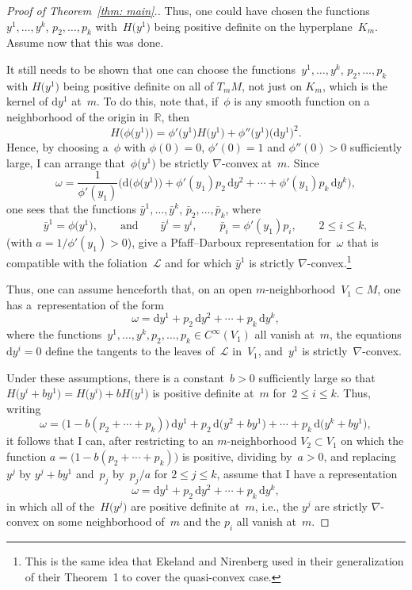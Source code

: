 \documentclass[11pt]{article}
\numberwithin{equation}{section}
\renewcommand{\d}{\mathrm{d}}%
\newcommand{\cL}{{\mathcal L}}
\newcommand{\bbR}{{\mathbb R}}
\numberwithin{equation}{section}
\begin{document}
\begin{proof}[Proof of Theorem~\ref{thm: main}.]
Thus, one could have chosen the functions~$y^1,\ldots,y^k$, $p_2,\ldots,p_k$
with~$H\big(y^1\big)$ being positive definite on the hyperplane~$K_m$.
Assume now that this was done.

It still needs to be shown that one can choose
the functions~$y^1,\ldots,y^k$, $p_2,\ldots,p_k$
with $H\big(y^1\big)$ being positive definite on all of $T_mM$,
not just on $K_m$, which is the kernel of $\d y^1$ at~$m$.
To do this, note that, if~$\phi$ is any smooth function on a neighborhood
of the origin in~$\bbR$, then
\[
H\bigl(\phi\big(y^1\big)\bigr) = \phi'\big(y^1\big) H\big(y^1\big) + \phi''\big(y^1\big) \big(\d y^1\big)^2.
\]
Hence, by choosing a~$\phi$ with $\phi(0)=0$, $\phi'(0)=1$
and $\phi''(0)>0$ sufficiently large,
I can arrange that~$\phi\big(y^1\big)$ be strictly $\nabla$-convex at~$m$.
Since
\[
\omega = \frac{1}{\phi'(y_1)} \big(\d\bigl(\phi\big(y^1\big)\bigr)
    + \phi'(y_1)p_2\,\d y^2 +\cdots + \phi'(y_1)p_k\,\d y^k\big),
\]
one sees that the functions
$\bar y^1,\ldots,\bar y^k$, $\bar p_2,\ldots,\bar p_k$, where
\[
\bar y^1 = \phi\big(y^1\big),
\qquad\text{and}\qquad
\bar y^i = y^i,
\qquad
\bar p_i = \phi'(y_1)p_i,\qquad 2\le i\le k,
\]
(with $a = 1/\phi'(y_1) >0$), give a Pfaff--Darboux representation
for~$\omega$ that is compatible with the foliation~$\cL$ and
for which $\bar y^1$ is strictly $\nabla$-convex.\footnote{This is the same idea that Ekeland and Nirenberg \cite{MR2023129}
used in their generalization of their Theorem~1
to cover the quasi-convex case.}

Thus, one can assume henceforth that,
on an open $m$-neighborhood~$V_1\subset M$,
one has a~representation of the form
\[
\omega = \d y^1 + p_2\,\d y^2 +\cdots + p_k\,\d y^k,
\]
where the functions~$y^1,\ldots,y^k,p_2,\ldots,p_k\in C^\infty(V_1)$
all vanish at~$m$,
the equations $\d y^i=0$ define the tangents to the leaves of~$\cL$ in~$V_1$,
and~$y^1$ is strictly~$\nabla$-convex.

Under these assumptions, there is a constant~$b>0$ sufficiently large
so that $H\big(y^i+by^1\big) = H\big(y^i\big)+b H\big(y^1\big)$ is positive definite at~$m$
for~$2\le i\le k$.
Thus, writing
\[
\omega = \bigl(1-b(p_2{+}\cdots{+}p_k)\bigr)\,\d y^1 + p_2\,\d\big(y^2+b y^1\big)
   + \cdots + p_k\,\d\big(y^k+b y^1\big),
\]
it follows that I can,
after restricting to an $m$-neighborhood $V_2\subset V_1$ on which
the function $a = \bigl(1-b(p_2{+}\cdots{+}p_k)\bigr)$ is positive,
dividing by~$a>0$,
and replacing~$y^j$ by $y^j+by^1$ and~$p_j$ by~$p_j/a$ for $2\le j\le k$,
assume that I have a representation
\[
\omega = \d y^1 + p_2\,\d y^2 +\cdots + p_k\,\d y^k,
\]
in which all of the~$H\big(y^j\big)$ are positive definite at~$m$,
i.e., the $y^j$ are strictly $\nabla$-convex on some neighborhood of~$m$
and the $p_i$ all vanish at~$m$.


\end{proof}
\end{document}
